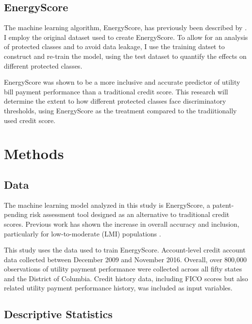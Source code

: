 \documentclass[11pt,]{article}
\begin{document}
\hypertarget{energyscore}{%
\subsection{EnergyScore}\label{energyscore}}

The machine learning algorithm, EnergyScore, has previously been
described by \citet{NBERw26178}. I employ the original dataset used to
create EnergyScore. To allow for an analysis of protected classes and to
avoid data leakage, I use the training datset to construct and re-train
the model, using the test dataset to quantify the effects on different
protected classes.

EnergyScore was shown to be a more inclusive and accurate predictor of
utility bill payment performance than a traditional credit score. This
research will determine the extent to how different protected classes
face discriminatory thresholds, using EnergyScore as the treatment
compared to the tradiitionally used credit score.

\hypertarget{methods}{%
\section{Methods}\label{methods}}

\hypertarget{data}{%
\subsection{Data}\label{data}}

The machine learning model analyzed in this study is EnergyScore, a
patent-pending risk assessment tool designed as an alternative to
traditional credit scores. Previous work has shown the increase in
overall accuracy and inclusion, particularly for low-to-moderate (LMI)
populations \citet{NBERw26178}.

This study uses the data used to train EnergyScore. Account-level credit
account data collected between December 2009 and November 2016. Overall,
over 800,000 observations of utility payment performance were collected
across all fifty states and the District of Columbia. Credit history
data, including FICO scores but also related utility payment performance
history, was included as input variables.

\hypertarget{descriptive-statistics}{%
\subsection{Descriptive Statistics}\label{descriptive-statistics}}
\end{document}
